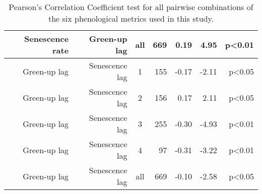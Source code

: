 \begin{table}[H]
\begin{tabular}{rrcrrrr}
  Senescence rate & Green-up lag & all & 669 & 0.19 & 4.95 & p<0.01 \\ 
   \hline
Green-up lag & Senescence lag & 1 & 155 & -0.17 & -2.11 & p<0.05 \\ 
  Green-up lag & Senescence lag & 2 & 156 & 0.17 & 2.11 & p<0.05 \\ 
  Green-up lag & Senescence lag & 3 & 255 & -0.30 & -4.93 & p<0.01 \\ 
  Green-up lag & Senescence lag & 4 &  97 & -0.31 & -3.22 & p<0.01 \\ 
  Green-up lag & Senescence lag & all & 669 & -0.10 & -2.58 & p<0.05 \\ 
   \hline
\end{tabular}
\caption{Pearson's Correlation Coefficient test for all pairwise combinations of the six phenological metrics used in this study.} 
\label{phen_corr}
\end{table}

